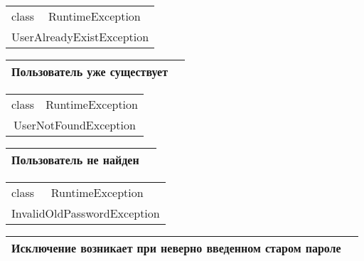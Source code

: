 \begin{table}[H]
\begin{tabular}{|p{8cm} p{8cm}|} 
\hline class & RuntimeException \\
\multicolumn{2}{|c|}{UserAlreadyExistException} \\ \hline
\end{tabular}
\begin{tabular}{|p{8cm}|p{8cm}|} 
  Пользователь уже существует  & \\
\hline 
\end{tabular}
 \label{crc-table-25}
\end{table}

\begin{table}[H]
\begin{tabular}{|p{8cm} p{8cm}|} 
\hline class & RuntimeException \\
\multicolumn{2}{|c|}{UserNotFoundException} \\ \hline
\end{tabular}
\begin{tabular}{|p{8cm}|p{8cm}|} 
  Пользователь не найден  & \\
\hline 
\end{tabular}
 \label{crc-table-26}
\end{table}

\begin{table}[H]
\begin{tabular}{|p{8cm} p{8cm}|} 
\hline class & RuntimeException \\
\multicolumn{2}{|c|}{InvalidOldPasswordException} \\ \hline
\end{tabular}
\begin{tabular}{|p{8cm}|p{8cm}|} 
  Исключение возникает при неверно введенном старом пароле  & \\
\hline 
\end{tabular}
 \label{crc-table-27}
\end{table}

